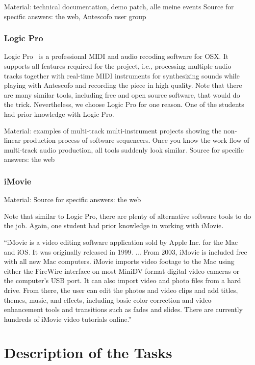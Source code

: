 \documentclass[onecolumn,nocopyrightspace,preprint]{sigplanconf}
\begin{document}
Material: technical documentation, demo patch, alle meine events
Source for specific answers: the web, Antescofo user group

\subsubsection{Logic Pro}

Logic Pro~\cite{website:logic} is a professional MIDI and audio recoding
software for OSX. It supports all features required for the project, i.e.,
processing multiple audio tracks together with real-time MIDI instruments for
synthesizing sounds while playing with Antescofo and recording the piece in
high quality.  Note that there are many similar tools, including free and open
source software, that would do the trick. Nevertheless, we choose Logic Pro
for one reason. One of the students had prior knowledge with Logic Pro.


Material: examples of multi-track multi-instrument projects showing
the non-linear production process of software sequencers. Once you know
the work flow of multi-track audio production, all tools suddenly look similar.
Source for specific answers: the web

\subsubsection{iMovie}

Material: 
Source for specific answers: the web


Note that similar to Logic Pro, there are plenty of alternative software
tools to do the job. Again, one student had prior knowledge in working
with iMovie. 


``iMovie is a video editing software application sold by Apple Inc. for the Mac
and iOS. It was originally released in 1999. ... From 2003, iMovie is included
free with all new Mac computers. iMovie imports video footage to the Mac using
either the FireWire interface on most MiniDV format digital video cameras or
the computer's USB port. It can also import video and photo files from a hard
drive. From there, the user can edit the photos and video clips and add
titles, themes, music, and effects, including basic color correction and video
enhancement tools and transitions such as fades and slides. There are
currently hundreds of iMovie video tutorials online.''~\cite{website:imovie}



\section{Description of the Tasks}
\end{document}
